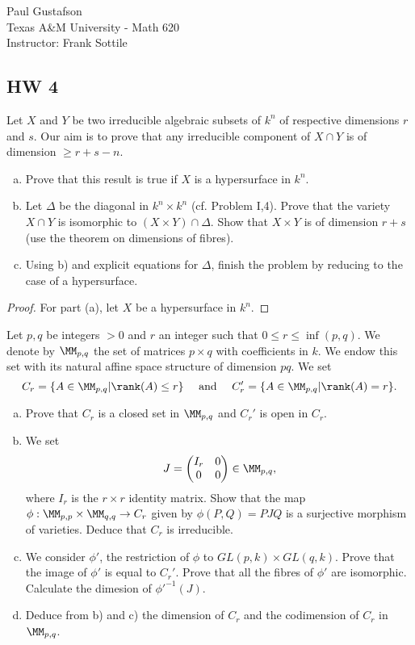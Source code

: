 \documentclass{article}
\begin{document}
\noindent Paul Gustafson\\
\noindent Texas A\&M University - Math 620\\ 
\noindent Instructor: Frank Sottile

\subsection*{HW 4} %
 Let $X$ and $Y$ be two irreducible algebraic subsets of $k^n$ of respective dimensions $r$ and $s$. 
Our aim is to prove that any irreducible component of $X \cap Y$ is of dimension $\ge r + s -n $.
\begin{enumerate}[a)]
\item Prove that this result is true if $X$ is a hypersurface in $k^n$.
\item Let $\Delta$ be the diagonal in $k^n \times k^n$ (cf. Problem I,4). Prove that
the variety $X \cap Y$ is isomorphic to $(X \times Y) \cap \Delta$. Show that $X \times Y$
is of dimension $r + s$ (use the theorem on dimensions of fibres).
\item Using b) and explicit equations for $\Delta$, finish the problem by reducing to
the case of a hypersurface.

\end{enumerate}

\begin{proof}
For part (a), let $X$ be a hypersurface in $k^n$.
\end{proof}


 Let $p,q$ be integers $ > 0$ and $r$ an integer such that $0 \le r \le \inf(p,q)$. We
denote by $\MM_{p,q}$ the set of matrices $p \times q$ with coefficients in $k$. We endow
this set with its natural affine space structure of dimension $pq$. We set
$$C_r = \{A \in \MM_{p,q} \vert \rank(A) \le r \} \quad \text{ and } \quad 
 C_r' = \{A \in \MM_{p,q} \vert \rank(A) = r \}.$$
\begin{enumerate}[a)]
\item Prove that $C_r$ is a closed set in $\MM_{p,q}$ and $C_r'$ is open in $C_r$.
\item We set
$$J = \begin{pmatrix}
   I_r & 0
\\ 0 & 0
\end{pmatrix}
\in \MM_{p,q},
$$
where $I_r$ is the $r \times r$ identity matrix. Show that the map $\phi: \MM_{p,p} \times \MM_{q,q} \to C_r$
given by $\phi(P,Q) = PJQ$ is a surjective morphism of varieties. Deduce that $C_r$ is irreducible.
\item We consider $\phi'$, the restriction of $\phi$ to $GL(p,k) \times GL(q,k)$. Prove that the image
of $\phi'$ is equal to $C_r'$. Prove that all the fibres of $\phi'$ are isomorphic. Calculate the
dimesion of $\phi'^{-1}(J)$.
\item Deduce from b) and c) the dimension of $C_r$ and the codimension of $C_r$ in $\MM_{p,q}$.
\end{enumerate}
\end{document}
